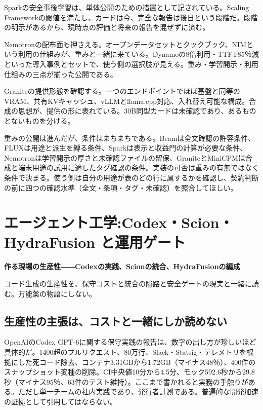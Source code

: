 \documentclass[lualatex,a4paper,10pt]{jlreq}
\begin{document}
Sparkの安全事後学習は、単体公開のための措置として記されている。Scaling Frameworkの閾値を満たし、カードは今、完全な報告は後日という段階だ。段階の明示があるから、現時点の評価と将来の報告を混ぜずに済む。
\cite{B14,B70,B15,B13,B71}


Nemotronの配布面も押さえる。オープンデータセットとクックブック、NIMという利用の仕組みが、重みと一緒に来ている。Dynamoの8倍利用・TTFT85％減といった導入事例とセットで、使う側の選択肢が見える。重み・学習開示・利用仕組みの三点が揃った公開である。
\cite{B21,B72,B22,B20}


Graniteの提供形態を確認する。一つのエンドポイントでほぼ基盤と同等のVRAM、共有KVキャッシュ、vLLMとllama.cpp対応、入れ替え可能な構成。合成の思想が、提供の形に表れている。30B同型カードは未確認であり、あるものとないものを分ける。
\cite{B24,B73,B23,B25}


重みの公開は進んだが、条件はまちまちである。Beamは全文確認の許容条件、FLUXは用途と派生を縛る条件、Sparkは表示と収益門の計算が必要な条件、Nemotronは学習開示の厚さと未確認ファイルの留保、GraniteとMiniCPMは合成と端末用途の試用に適したタグ確認の条件。実装の可否は重みの有無ではなく条件で決まる。使う側は自分の用途が表のどの行に属するかを確認し、契約判断の前に四つの確認水準（全文・条項・タグ・未確認）を照合してほしい。
\cite{B14,B70,B15,B13,B71,B17,B19,B18,B16,B21,B72,B22,B20,B24,B73,B23,B25,B27,B74,B26,B29,B28,B30}


\section{エージェント工学:Codex・Scion・HydraFusion と運用ゲート}
\label{sec:P4}

{\Large\bfseries 作る現場の生産性――Codexの実践、Scionの統合、HydraFusionの編成\par}
\smallskip
{\color{SurveyMuted}コード生成の生産性を、保守コストと統合の隘路と安全ゲートの現実と一緒に読む。万能薬の物語にしない。\par}
\bigskip

\subsection*{生産性の主張は、コストと一緒にしか読めない}

OpenAIのCodex GPT-6に関する保守実践の報告は、数字の出し方が珍しいほど具体的だ。1400超のプルリクエスト、80万行、Slack・Statsig・テレメトリを根拠にした死コード除去、コンテナ3.31GBから1.72GB（マイナス48％）、400件のスナップショット変種の削除。CI中央値10分から4.5分、モック592.6秒から29.8秒（マイナス95％、63件のテスト維持）。ここまで書かれると実務の手触りがある。ただし単一チームの社内実践であり、発行者計測である。普遍的な開発加速の証拠として引用してはならない。
\cite{B31}
\end{document}
